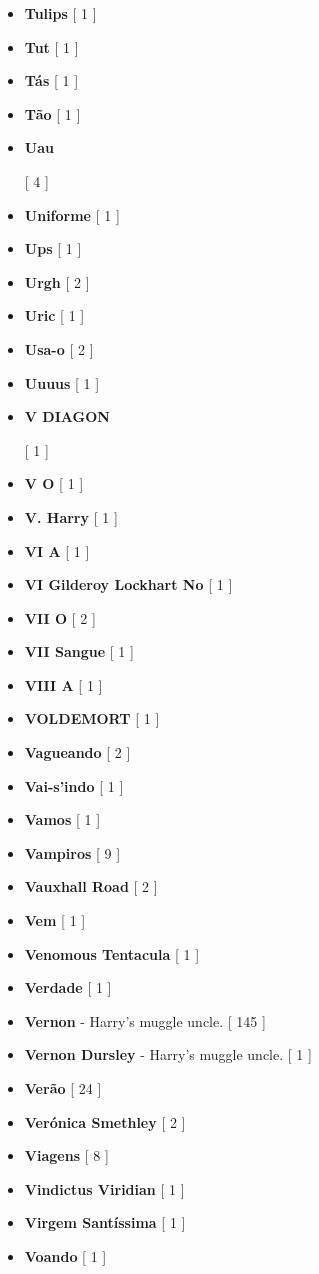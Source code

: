 \documentclass[a4paper]{article}
\begin{document}
\begin{itemize}
	\item \textbf{Tulips} [ 1 ]
	\item \textbf{Tut} [ 1 ]
	\item \textbf{Tás} [ 1 ]
	\item \textbf{Tão} [ 1 ]
	\item \hypertarget{U}{\textbf{Uau}} [ 4 ]
	\item \textbf{Uniforme} [ 1 ]
	\item \textbf{Ups} [ 1 ]
	\item \textbf{Urgh} [ 2 ]
	\item \textbf{Uric} [ 1 ]
	\item \textbf{Usa-o} [ 2 ]
	\item \textbf{Uuuus} [ 1 ]
	\item \hypertarget{V}{\textbf{V DIAGON}} [ 1 ]
	\item \textbf{V O} [ 1 ]
	\item \textbf{V. Harry} [ 1 ]
	\item \textbf{VI A} [ 1 ]
	\item \textbf{VI Gilderoy Lockhart No} [ 1 ]
	\item \textbf{VII O} [ 2 ]
	\item \textbf{VII Sangue} [ 1 ]
	\item \textbf{VIII A} [ 1 ]
	\item \textbf{VOLDEMORT} [ 1 ]
	\item \textbf{Vagueando} [ 2 ]
	\item \textbf{Vai-s'indo} [ 1 ]
	\item \textbf{Vamos} [ 1 ]
	\item \textbf{Vampiros} [ 9 ]
	\item \textbf{Vauxhall Road} [ 2 ]
	\item \textbf{Vem} [ 1 ]
	\item \textbf{Venomous Tentacula} [ 1 ]
	\item \textbf{Verdade} [ 1 ]
	\item \textbf{Vernon} - Harry's muggle uncle. [ 145 ]
	\item \textbf{Vernon Dursley} - Harry's muggle uncle. [ 1 ]
	\item \textbf{Verão} [ 24 ]
	\item \textbf{Verónica Smethley} [ 2 ]
	\item \textbf{Viagens} [ 8 ]
	\item \textbf{Vindictus Viridian} [ 1 ]
	\item \textbf{Virgem Santíssima} [ 1 ]
	\item \textbf{Voando} [ 1 ]

\end{itemize}
\end{document}
